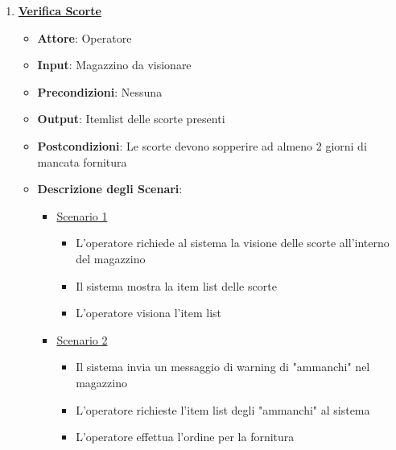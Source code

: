\begin{enumerate}
    \item \uline {{\bf Verifica Scorte}}
    \begin{itemize}
        \item {\bf Attore}: Operatore
        \item {\bf Input}: Magazzino da visionare
        \item {\bf Precondizioni}: Nessuna
        \item {\bf Output}: Itemlist delle scorte presenti
        \item {\bf Postcondizioni}: Le scorte devono sopperire ad almeno 2 giorni di mancata
            fornitura
        \item {\bf Descrizione degli Scenari}:
        \begin{itemize}
            \item \uline{Scenario 1}
            \begin{itemize}
                \item L'operatore richiede al sistema la visione delle scorte all'interno del magazzino
                \item Il sistema mostra la item list delle scorte
                \item L'operatore visiona l'item list
            \end{itemize}
            \item \uline{Scenario 2}
            \begin{itemize}
                \item Il sistema invia un messaggio di warning di "ammanchi" nel magazzino
                \item L'operatore richieste l'item list degli "ammanchi" al sistema 
                \item L'operatore effettua l'ordine per la fornitura
            \end{itemize}
        \end{itemize}
    \end{itemize} 

\end{enumerate}
